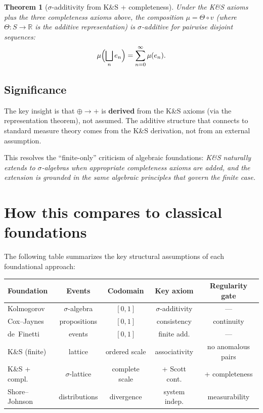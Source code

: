 \documentclass[11pt]{article}
\newtheorem{theorem}{Theorem}[section]
\theoremstyle{definition}
\theoremstyle{remark}
\begin{document}
\begin{theorem}[$\sigma$-additivity from K\&S + completeness]
Under the K\&S axioms plus the three completeness axioms above, the composition
$\mu = \Theta \circ v$ (where $\Theta : S \to \mathbb{R}$ is the additive representation)
is $\sigma$-additive for pairwise disjoint sequences:
\[
\mu\Bigl(\bigsqcup_n e_n\Bigr) = \sum_{n=0}^\infty \mu(e_n).
\]
\end{theorem}


\subsection{Significance}

The key insight is that $\oplus \to +$ is \textbf{derived} from the K\&S axioms (via the representation
theorem), not assumed.  The additive structure that connects to standard measure theory comes from
the K\&S derivation, not from an external assumption.

This resolves the ``finite-only'' criticism of algebraic foundations: \emph{K\&S naturally extends to
$\sigma$-algebras when appropriate completeness axioms are added, and the extension is grounded
in the same algebraic principles that govern the finite case.}

\section{How this compares to classical foundations}

The following table summarizes the key structural assumptions of each foundational approach:

\begin{center}
\small
\begin{tabular}{|l|c|c|c|c|}
\hline
\textbf{Foundation} & \textbf{Events} & \textbf{Codomain} & \textbf{Key axiom} & \textbf{Regularity gate} \\
\hline
Kolmogorov & $\sigma$-algebra & $[0,1]$ & $\sigma$-additivity & --- \\
\hline
Cox--Jaynes & propositions & $[0,1]$ & consistency & continuity \\
\hline
de~Finetti & events & $[0,1]$ & finite add. & --- \\
\hline
K\&S (finite) & lattice & ordered scale & associativity & no anomalous pairs \\
\hline
K\&S + compl. & $\sigma$-lattice & complete scale & + Scott cont. & + completeness \\
\hline
Shore--Johnson & distributions & divergence & system indep. & measurability \\
\hline
\end{tabular}
\end{center}
\end{document}
